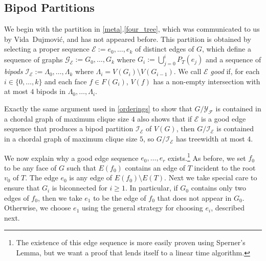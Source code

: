 \documentclass{patmorin}
\begin{document}
%

\subsection{Bipod Partitions}

We begin with the partition in \cref{meta}.\ref{four_tree}, which was communicated to us by Vida~Dujmović, and has not appeared before.  This partition is obtained by selecting a proper sequence $\mathcal{E}:=e_0,\ldots,e_k$ of distinct edges of $G$, which define a sequence of graphs $\mathcal{G}_\mathcal{E}:=G_{0},\ldots,G_k$ where $G_i:=\bigcup_{j=0}^i P_T(e_j)$ and a sequence of \emph{bipods} $\mathcal{I}_\mathcal{E}:=\Lambda_0,\ldots,\Lambda_k$ where $\Lambda_i=V(G_i)\setminus V(G_{i-1})$.  We call $\mathcal{E}$ \emph{good} if, for each $i\in\{0,\ldots,k\}$ and each face $f\in F(G_i)$, $V(f)$ has a non-empty intersection with at most $4$ bipods in $\Lambda_0,\ldots,\Lambda_i$.

Exactly the same argument used in \cref{orderings} to show that $G/\mathcal{Y}_\mathcal{F}$ is contained in a chordal graph of maximum clique size $4$ also shows that if $\mathcal{E}$ is a good edge sequence that produces a bipod partition $\mathcal{I}_\mathcal{E}$ of $V(G)$, then $G/\mathcal{I}_\mathcal{E}$ is contained in a chordal graph of maximum clique size $5$, so $G/\mathcal{I}_\mathcal{E}$ has treewidth at most $4$.

We now explain why a good edge sequence $e_0,\ldots,e_r$ exists.\footnote{The existence of this edge sequence is more easily proven using Sperner's Lemma, but we want a proof that lends itself to a linear time algorithm.}  As before, we set $f_0$ to be any face of $G$ such that $E(f_0)$ contains an edge of $T$ incident to the root $v_0$ of $T$.  The edge $e_0$ is any edge of $E(f_0)\setminus E(T)$.  Next we take special care to ensure that $G_i$ is biconnected for $i\ge 1$.  In particular, if $G_0$ contains only two edges of $f_0$, then we take $e_1$ to be the edge of $f_0$ that does not appear in $G_0$.  Otherwise, we choose $e_1$ using the general strategy for choosing $e_i$, described next.
\end{document}
